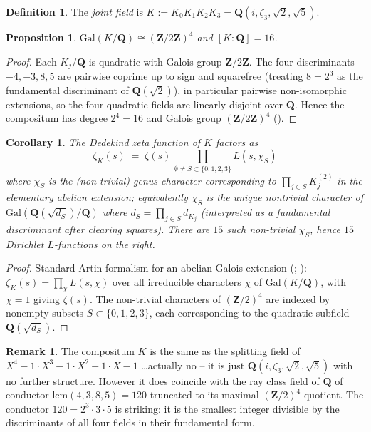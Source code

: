 \documentclass[11pt]{article}
\newtheorem{proposition}[theorem]{Proposition}
\newtheorem{corollary}[theorem]{Corollary}
\theoremstyle{definition}
\newtheorem{definition}[theorem]{Definition}
\newtheorem{remark}[theorem]{Remark}
\newcommand{\Z}{\mathbf{Z}}
\newcommand{\Q}{\mathbf{Q}}
\begin{document}
\begin{definition}\label{def:joint-field}
The \emph{joint field} is $K := K_0 K_1 K_2 K_3 = \Q(i, \zeta_3, \sqrt 2, \sqrt 5)$.
\end{definition}

\begin{proposition}\label{prop:galois-joint}
$\mathrm{Gal}(K/\Q) \cong (\Z/2\Z)^4$ and $[K:\Q] = 16$.
\end{proposition}

\begin{proof}
Each $K_j/\Q$ is quadratic with Galois group $\Z/2\Z$. The four discriminants
$-4, -3, 8, 5$ are pairwise coprime up to sign and squarefree (treating $8 = 2^3$ as the
fundamental discriminant of $\Q(\sqrt 2)$), in particular pairwise non-isomorphic
extensions, so the four quadratic fields are linearly disjoint over $\Q$. Hence the
compositum has degree $2^4 = 16$ and Galois group $(\Z/2\Z)^4$ (\cite[\S V.4]{lang-alg}).
\end{proof}

\begin{corollary}\label{cor:joint-zeta}
The Dedekind zeta function of $K$ factors as
\[
   \zeta_K(s) \;=\; \zeta(s) \,\prod_{\emptyset \ne S \subset \{0,1,2,3\}}
                    L(s, \chi_S)
\]
where $\chi_S$ is the (non-trivial) genus character corresponding to
$\prod_{j\in S} K_j^{(2)}$ in the elementary abelian extension; equivalently
$\chi_S$ is the unique nontrivial character of $\mathrm{Gal}(\Q(\sqrt{d_S})/\Q)$
where $d_S = \prod_{j \in S} d_{K_j}$ (interpreted as a fundamental discriminant after
clearing squares). There are $15$ such non-trivial $\chi_S$, hence $15$ Dirichlet
$L$-functions on the right.
\end{corollary}

\begin{proof}
Standard Artin formalism for an abelian Galois extension (\cite[\S V.6]{lang-alg};
\cite{neukirch}): $\zeta_K(s) = \prod_{\chi} L(s,\chi)$ over all irreducible characters
$\chi$ of $\mathrm{Gal}(K/\Q)$, with $\chi = 1$ giving $\zeta(s)$. The non-trivial
characters of $(\Z/2)^4$ are indexed by nonempty subsets $S \subset \{0,1,2,3\}$, each
corresponding to the quadratic subfield $\Q(\sqrt{d_S})$.
\end{proof}

\begin{remark}\label{rmk:joint-fields-are-binary-cubic}
The compositum $K$ is the same as the splitting field of $X^4 - 1 \cdot X^3 - 1 \cdot X^2 - 1\cdot X - 1$
\ldots actually no -- it is just $\Q(i, \zeta_3, \sqrt 2, \sqrt 5)$ with no further structure.
However it does coincide with the ray class field of $\Q$ of conductor
$\mathrm{lcm}(4, 3, 8, 5) = 120$ truncated to its maximal $(\Z/2)^4$-quotient. The
conductor $120 = 2^3 \cdot 3 \cdot 5$ is striking: it is the smallest integer divisible by the
discriminants of all four fields in their fundamental form.
\end{remark}
\end{document}
